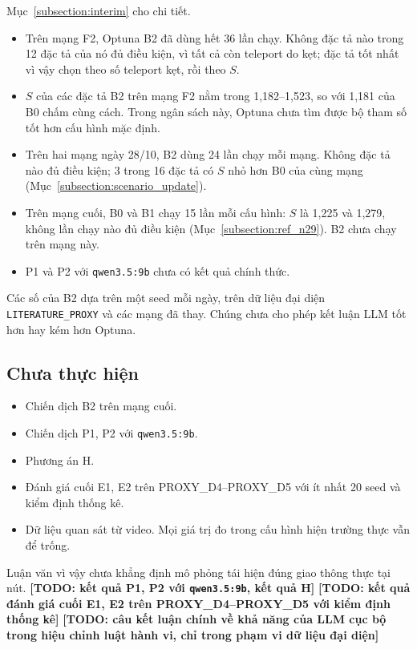 \documentclass[../DoAn.tex]{subfiles}
\begin{document}
Mục~\ref{subsection:interim} cho chi tiết.
\begin{itemize}
    \item Trên mạng F2, Optuna B2 đã dùng hết 36 lần chạy. Không đặc tả nào trong 12 đặc tả của nó đủ điều kiện, vì tất cả còn teleport do kẹt; đặc tả tốt nhất vì vậy chọn theo số teleport kẹt, rồi theo $S$.
    \item $S$ của các đặc tả B2 trên mạng F2 nằm trong 1,182--1,523, so với 1,181 của B0 chấm cùng cách. Trong ngân sách này, Optuna chưa tìm được bộ tham số tốt hơn cấu hình mặc định.
    \item Trên hai mạng ngày 28/10, B2 dùng 24 lần chạy mỗi mạng. Không đặc tả nào đủ điều kiện; 3 trong 16 đặc tả có $S$ nhỏ hơn B0 của cùng mạng (Mục~\ref{subsection:scenario_update}).
    \item Trên mạng cuối, B0 và B1 chạy 15 lần mỗi cấu hình: $S$ là 1,225 và 1,279, không lần chạy nào đủ điều kiện (Mục~\ref{subsection:ref_n29}). B2 chưa chạy trên mạng này.
    \item P1 và P2 với \texttt{qwen3.5:9b} chưa có kết quả chính thức.
\end{itemize}
Các số của B2 dựa trên một seed mỗi ngày, trên dữ liệu đại diện \texttt{LITERATURE\_PROXY} và các mạng đã thay. Chúng chưa cho phép kết luận LLM tốt hơn hay kém hơn Optuna.

\subsection{Chưa thực hiện}

\begin{itemize}
    \item Chiến dịch B2 trên mạng cuối.
    \item Chiến dịch P1, P2 với \texttt{qwen3.5:9b}.
    \item Phương án H.
    \item Đánh giá cuối E1, E2 trên PROXY\_D4--PROXY\_D5 với ít nhất 20 seed và kiểm định thống kê.
    \item Dữ liệu quan sát từ video. Mọi giá trị đo trong cấu hình hiện trường thực vẫn để trống.
\end{itemize}
Luận văn vì vậy chưa khẳng định mô phỏng tái hiện đúng giao thông thực tại nút. \textbf{[TODO: kết quả P1, P2 với \texttt{qwen3.5:9b}, kết quả H]} \textbf{[TODO: kết quả đánh giá cuối E1, E2 trên PROXY\_D4--PROXY\_D5 với kiểm định thống kê]} \textbf{[TODO: câu kết luận chính về khả năng của LLM cục bộ trong hiệu chỉnh luật hành vi, chỉ trong phạm vi dữ liệu đại diện]}
\end{document}
